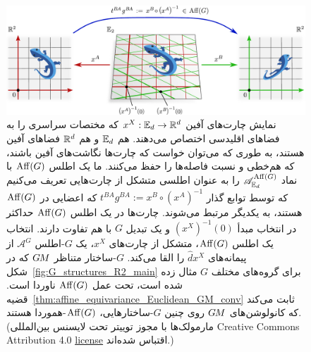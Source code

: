 \begin{figure}
	\centering
	\includegraphics[width=1.\textwidth]{figures/affine_charts.pdf}
	\vspace*{2ex}
	\caption{\small
		نمایش چارت‌های آفین $x^X: \mathbb{E}_d \to \mathbb{R}^d$ که مختصات سراسری را به فضاهای اقلیدسی اختصاص می‌دهند.
		هم $\mathbb{E}_d$ و هم $\mathbb{R}^d$ فضاهای آفین هستند، به طوری که می‌توان خواست که چارت‌ها نگاشت‌های آفین باشند، که هم‌خطی و نسبت فاصله‌ها را حفظ می‌کنند.
		ما یک اطلس $\operatorname{Aff}(G)$ با نماد $\mathscr{A}^{\operatorname{Aff}(G)}_{\mathbb{E}_d}$ را به عنوان اطلسی متشکل از چارت‌هایی تعریف می‌کنیم که توسط توابع گذار $t^{BA} g^{BA} := x^B \circ (x^A)^{-1}$ که اعضایی در $\operatorname{Aff}(G)$ هستند، به یکدیگر مرتبط می‌شوند.
		چارت‌ها در یک اطلس $\operatorname{Aff}(G)$ حداکثر در انتخاب مبدأ $(x^X)^{-1}(0)$ و یک تبدیل $G$ با هم تفاوت دارند.
		انتخاب یک اطلس $\operatorname{Aff}(G)$، متشکل از چارت‌های $x^X$، یک $G$-اطلس $\mathscr{A}^G$ از پیمانه‌های $\hat{d}x^X$ را القا می‌کند.
		$G$-ساختار متناظر $G\mkern-1.4muM$ که در شکل~\ref{fig:G_structures_R2_main} برای گروه‌های مختلف $G$ مثال زده شده است، تحت عمل $\operatorname{Aff}(G)$ ناوردا است.
		قضیه~\ref{thm:affine_equivariance_Euclidean_GM_conv} ثابت می‌کند که کانولوشن‌های $G\mkern-1.4muM$ روی چنین $G$-ساختارهایی، $\operatorname{Aff}(G)$-هموردا هستند.
		{\\
			\color{gray}
			\scriptsize
			(مارمولک‌ها با مجوز توییتر تحت لایسنس بین‌المللی 
			Creative Commons Attribution 4.0 
			\href{https://github.com/twitter/twemoji/blob/gh-pages/LICENSE-GRAPHICS}{\underline{license}}
			اقتباس شده‌اند.)
		}
	}
	\label{fig:affine_charts}
\end{figure}


